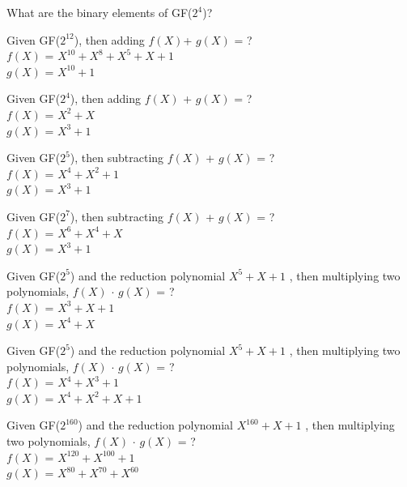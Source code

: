 \begin{exer}
What are the binary elements of GF($2^4$)?
\end{exer}
\begin{exer}
Given GF($2^{12}$), then adding $f(X)$+ $g(X)$ = ?
        \\ $f(X)$ = $X^{10} + X^8 + X^5 + X + 1$
        \\ $g(X)$ = $X^{10} + 1$
\end{exer}
\begin{exer}
Given GF($2^4$), then adding $f(X)$ + $g(X)$ = ?
        \\ $f(X)$ = $X^{2} + X $
        \\ $g(X)$ = $X^{3} + 1$
\end{exer}
\begin{exer}
Given GF($2^5$), then subtracting $f(X)$ + $g(X)$ = ?
        \\ $f(X)$ = $X^{4} + X^2 + 1 $
        \\ $g(X)$ = $X^{3} + 1$
\end{exer}
\begin{exer}
Given GF($2^7$), then subtracting $f(X)$ + $g(X)$ = ?
        \\ $f(X)$ = $X^{6} + X^4 + X $
        \\ $g(X)$ = $X^{3} + 1$
\end{exer}
\begin{exer}
Given GF($2^5$) and the reduction polynomial $X^5 + X + 1$ , then multiplying two polynomials, $f(X)$ $\cdot$ $g(X)$ = ?
        \\ $f(X)$ = $X^{3} + X + 1 $
        \\ $g(X)$ = $X^{4} + X$
\end{exer}
\begin{exer}
Given GF($2^5$) and the reduction polynomial $X^5 + X + 1$ , then multiplying two polynomials, $f(X)$ $\cdot$ $g(X)$ = ?
        \\ $f(X)$ = $X^{4} + X^3 + 1 $
        \\ $g(X)$ = $X^{4} + X^2 + X + 1$
\end{exer}
\begin{exer}
Given GF($2^{160}$) and the reduction polynomial $X^{160} + X + 1$ , then multiplying two polynomials, $f(X)$ $\cdot$ $g(X)$ = ?
        \\ $f(X)$ = $X^{120} + X^{100} + 1 $
        \\ $g(X)$ = $X^{80} + X^{70} + X^{60}$
\end{exer}

